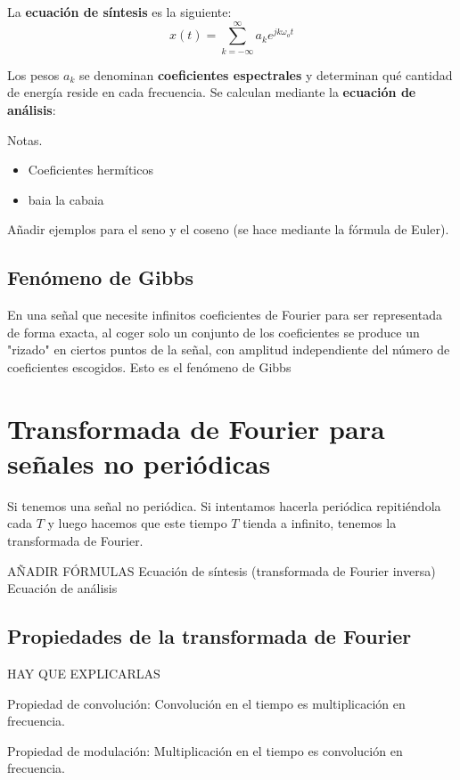 \documentclass[a4paper]{book}
\begin{document}
La \textbf{ecuación de síntesis} es la siguiente:
\begin{equation}
	x(t) = \sum_{k=-\infty}^{\infty}a_k e^{jk\omega _o t}
\end{equation}

Los pesos $a_k$ se denominan \textbf{coeficientes espectrales} y determinan qué cantidad de energía reside en cada frecuencia. Se calculan mediante la \textbf{ecuación de análisis}:
\[  \]

Notas.
\begin{itemize}
	\item Coeficientes hermíticos
	\item baia la cabaia
\end{itemize}

Añadir ejemplos para el seno y el coseno (se hace mediante la fórmula de Euler).

\subsection{Fenómeno de Gibbs}

En una señal que necesite infinitos coeficientes de Fourier para ser representada de forma exacta, al coger solo un conjunto de los coeficientes se produce un "rizado" en ciertos puntos de la señal, con amplitud independiente del número de coeficientes escogidos. Esto es el fenómeno de Gibbs

\section{Transformada de Fourier para señales no periódicas}

Si tenemos una señal no periódica. Si intentamos hacerla periódica repitiéndola cada $T$ y luego hacemos que este tiempo $T$ tienda a infinito, tenemos la transformada de Fourier.

AÑADIR FÓRMULAS
Ecuación de síntesis (transformada de Fourier inversa)
Ecuación de análisis

\subsection{Propiedades de la transformada de Fourier}
HAY QUE EXPLICARLAS

Propiedad de convolución: Convolución en el tiempo es multiplicación en frecuencia.

Propiedad de modulación: Multiplicación en el tiempo es convolución en frecuencia.
\end{document}
